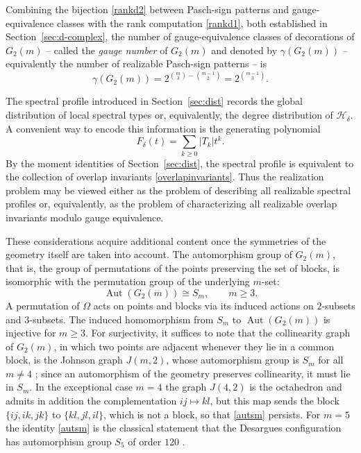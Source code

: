 \documentclass[times,11pt,reqno]{amsproc}
\theoremstyle{definition}
\numberwithin{equation}{section}
\DeclareMathOperator{\Aut}{Aut}
\begin{document}
Combining the bijection \eqref{rankd2} between Pasch-sign patterns and
gauge-equivalence classes with the rank computation \eqref{rankd1}, both
established in Section~\ref{sec:d-complex}, the number of
gauge-equivalence classes of decorations of $G_2(m)$ -- called the
\emph{gauge number} of $G_2(m)$ and denoted by $\gamma(G_2(m))$ --
equivalently the number of realizable Pasch-sign patterns -- is
\begin{equation}\label{gaugecount}
\gamma(G_2(m))
=
2^{\binom{m}{3}-\binom{m-1}{2}}
=
2^{\binom{m-1}{3}}.
\end{equation}

The spectral profile introduced in Section~\ref{sec:dist} records the
global distribution of local spectral types or, equivalently, the degree
distribution of $\mathscr H_\delta$. A convenient way to encode this
information is the generating polynomial
\begin{equation}
F_\delta(t)
=
\sum_{k\ge0}|T_k|t^k.
\end{equation}
By the moment identities of Section~\ref{sec:dist}, the spectral profile is
equivalent to the collection of overlap invariants \eqref{overlapinvariants}.
Thus the realization problem may be viewed either as the problem of
describing all realizable spectral profiles or, equivalently, as the
problem of characterizing all realizable overlap invariants modulo gauge
equivalence.

These considerations acquire additional content once the symmetries of
the geometry itself are taken into account. The automorphism group of
$G_2(m)$, that is, the group of permutations of the points preserving
the set of blocks, is isomorphic with the permutation group of the underlying $m$-set:
\begin{equation}\label{autsm}
\Aut(G_2(m))
\cong
S_m,
\qquad
m\ge3.
\end{equation}
A permutation of $\Omega$ acts on points and blocks via its induced actions
on $2$-subsets and $3$-subsets. The induced homomorphism from $S_m$ to $\Aut(G_2(m))$ is injective for $m\ge3$.
For surjectivity, it
suffices to note that the collinearity graph of $G_2(m)$, in which two
points are adjacent whenever they lie in a common block, is the Johnson
graph $J(m,2)$, whose automorphism group is $S_m$ for all $m\ne4$
\cite{Ramras-Donovan,Ganesan,Brouwer-Cohen-Neumaier}; since an
automorphism of the geometry preserves collinearity, it must lie
in $S_m$. In the exceptional case $m=4$ the graph $J(4,2)$ is the
octahedron and admits in addition the complementation
$ij\mapsto kl$, but this map sends the block $\{ij,ik,jk\}$ to
$\{kl,jl,il\}$, which is not a block, so that \eqref{autsm} persists.
For $m=5$ the identity \eqref{autsm} is the classical statement that the
Desargues configuration has automorphism group $S_5$ of order $120$
\cite{Knarr-Stroppel-Stroppel}.
\end{document}

